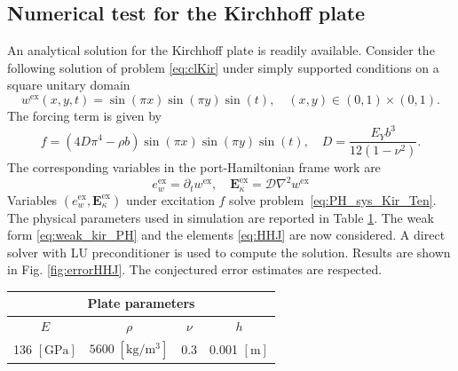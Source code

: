 \documentclass{ifacconf}
\begin{document}
 
\subsection{Numerical test for the Kirchhoff plate}
An analytical solution for the Kirchhoff plate is readily available. Consider the following solution of problem \eqref{eq:clKir} under simply supported conditions on a square unitary domain
\[
w^{\text{ex}}(x,y,t) = \sin(\pi x) \sin(\pi y) \sin(t), \quad  (x, y) \in (0,1)\times (0,1).
\] 
The forcing term is given by  
\[
f = (4 D \pi^4 - \rho b) \sin(\pi x) \sin(\pi y) \sin(t), \quad D = \frac{E_Y b^3}{12 (1-\nu^2)}.
\]
The corresponding variables in the port-Hamiltonian frame work are
\[
e_w^{\text{ex}} = \partial_t w^{\text{ex}}, \quad \bm{E}_\kappa^{\text{ex}} = \mathcal{D} \nabla^2 w^{\text{ex}}
\]
Variables $(e_w^{\text{ex}}, \bm{E}_\kappa^{\text{ex}})$ under excitation $f$ solve problem~\eqref{eq:PH_sys_Kir_Ten}. The physical parameters used in simulation are reported in Table \ref{tab:parKir}. The weak form \eqref{eq:weak_kir_PH} and the elements \eqref{eq:HHJ} are now considered. A direct solver with LU preconditioner is used to compute the solution. Results are shown in Fig. \ref{fig:errorHHJ}. The conjectured error estimates are respected.

\begin{table}[h]
	\centering
	\begin{tabular}{cccc}
		\hline 
		\multicolumn{4}{c}{Plate parameters} \\ 
		\hline 
		$E$ & $\rho$ & $\nu$  & $h$ \\
		136 $[\textrm{GPa}]$ & $5600\; [\textrm{kg}/\textrm{m}^3]$ & 0.3 &  0.001 $[\textrm{m}]$\\ 
		\hline 
	\end{tabular} 
	\captionsetup{width=0.95\linewidth}
	\vspace{1mm}
	\label{tab:parKir}
\end{table}
\end{document}
